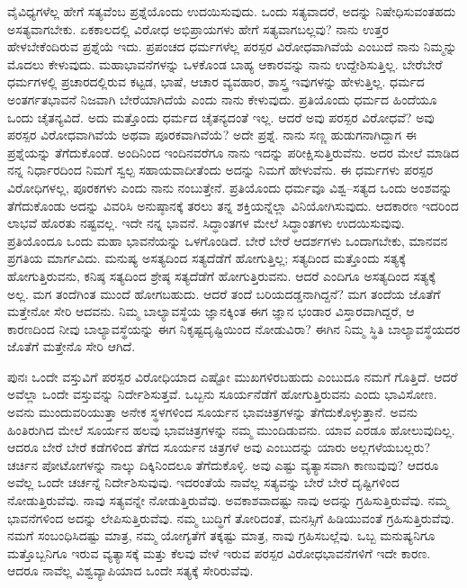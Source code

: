ವೈವಿಧ್ಯಗಳೆಲ್ಲ ಹೇಗೆ ಸತ್ಯವೆಂಬ ಪ್ರಶ್ನೆಯೊಂದು ಉದಯಿಸುವುದು. ಒಂದು ಸತ್ಯವಾದರೆ, ಅದನ್ನು ನಿಷೇಧಿಸುವಂತಹದು ಅಸತ್ಯವಾಗಬೇಕು. ಏಕಕಾಲದಲ್ಲಿ ವಿರೋಧ ಅಭಿಪ್ರಾಯಗಳು ಹೇಗೆ ಸತ್ಯವಾಗಬಲ್ಲವು? ನಾನು ಉತ್ತರ ಹೇಳಬೇಕೆಂದಿರುವ ಪ್ರಶ್ನೆಯೆ ಇದು. ಪ್ರಪಂಚದ ಧರ್ಮಗಳೆಲ್ಲ ಪರಸ್ಪರ ವಿರೋಧವಾಗಿವೆಯೆ ಎಂಬುದೆ ನಾನು ನಿಮ್ಮನ್ನು ಮೊದಲು ಕೇಳುವುದು. ಮಹಾಭಾವನೆಗಳನ್ನು ಒಳಕೊಂಡ ಬಾಹ್ಯ ಆಕಾರವನ್ನು ನಾನು ಉದ್ದೇಶಿಸುತ್ತಿಲ್ಲ. ಬೇರೆಬೇರೆ ಧರ್ಮಗಳಲ್ಲಿ ಪ್ರಚಾರದಲ್ಲಿರುವ ಕಟ್ಟಡ, ಭಾಷೆ, ಆಚಾರ ವ್ಯವಹಾರ, ಶಾಸ್ತ್ರ ಇವುಗಳನ್ನು ಹೇಳುತ್ತಿಲ್ಲ. ಧರ್ಮದ ಅಂತರ್ಗತಭಾವನೆ ನಿಜವಾಗಿ ಬೇರೆಯಾಗಿದೆಯೆ ಎಂದು ನಾನು ಕೇಳುವುದು. ಪ್ರತಿಯೊಂದು ಧರ್ಮದ ಹಿಂದೆಯೂ ಒಂದು ಚೈತನ್ಯವಿದೆ. ಅದು ಮತ್ತೊಂದು ಧರ್ಮದ ಚೈತನ್ಯದಂತೆ ಇಲ್ಲ. ಆದರೆ ಅವು ಪರಸ್ಪರ ವಿರೋಧವೆ? ಅವು ಪರಸ್ಪರ ವಿರೋಧವಾಗಿವೆಯೆ ಅಥವಾ ಪೂರಕವಾಗಿವೆಯೆ? ಅದೇ ಪ್ರಶ್ನೆ. ನಾನು ಸಣ್ಣ ಹುಡುಗನಾಗಿದ್ದಾಗ ಈ ಪ್ರಶ್ನೆಯನ್ನು ತೆಗೆದುಕೊಂಡೆ. ಅಂದಿನಿಂದ ಇಂದಿನವರೆಗೂ ನಾನು ಇದನ್ನು ಪರೀಕ್ಷಿಸುತ್ತಿರುವೆನು. ಅದರ ಮೇಲೆ ಮಾಡಿದ ನನ್ನ ನಿರ್ಧಾರದಿಂದ ನಿಮಗೆ ಸ್ವಲ್ಪ ಸಹಾಯವಾದೀತೆಂದು ಅದನ್ನು ನಿಮಗೆ ಹೇಳುವೆನು. ಈ ಧರ್ಮಗಳು ಪರಸ್ಪರ ವಿರೋಧಿಗಳಲ್ಲ, ಪೂರಕಗಳು ಎಂದು ನಾನು ನಂಬುತ್ತೇನೆ. ಪ್ರತಿಯೊಂದು ಧರ್ಮವೂ ವಿಶ್ವ–ಸತ್ಯದ ಒಂದು ಅಂಶವನ್ನು ತೆಗೆದುಕೊಂಡು ಅದನ್ನು ವಿವರಿಸಿ ಅನುಷ್ಠಾನಕ್ಕೆ ತರಲು ತನ್ನ ಶಕ್ತಿಯನ್ನೆಲ್ಲಾ ವಿನಿಯೋಗಿಸುವುದು. ಆದಕಾರಣ ಇದರಿಂದ ಲಾಭವೆ ಹೊರತು ನಷ್ಟವಲ್ಲ. ಇದೇ ನನ್ನ ಭಾವನೆ. ಸಿದ್ಧಾಂತಗಳ ಮೇಲೆ ಸಿದ್ಧಾಂತಗಳು ಉದಯಿಸುವುವು. ಪ್ರತಿಯೊಂದೂ ಒಂದು ಮಹಾ ಭಾವನೆಯನ್ನು ಒಳಗೊಂಡಿದೆ. ಬೇರೆ ಬೇರೆ ಆದರ್ಶಗಳು ಒಂದಾಗಬೇಕು, ಮಾನವನ ಪ್ರಗತಿಯ ಮಾರ್ಗವಿದು. ಮನುಷ್ಯ ಅಸತ್ಯದಿಂದ ಸತ್ಯದೆಡೆಗೆ ಹೋಗುತ್ತಿಲ್ಲ; ಸತ್ಯದಿಂದ ಮತ್ತೊಂದು ಸತ್ಯಕ್ಕೆ ಹೋಗುತ್ತಿರುವನು, ಕನಿಷ್ಠ ಸತ್ಯದಿಂದ ಶ್ರೇಷ್ಠ ಸತ್ಯದೆಡೆಗೆ ಹೋಗುತ್ತಿರುವನು. ಆದರೆ ಎಂದಿಗೂ ಅಸತ್ಯದಿಂದ ಸತ್ಯಕ್ಕೆ ಅಲ್ಲ. ಮಗ ತಂದೆಗಿಂತ ಮುಂದೆ ಹೋಗಬಹುದು. ಆದರೆ ತಂದೆ ಬರಿಯ\break ದಡ್ಡನಾಗಿದ್ದನೆ? ಮಗ ತಂದೆಯ ಜೊತೆಗೆ ಮತ್ತೇನೋ ಸೇರಿ ಆದವನು. ನಿಮ್ಮ ಬಾಲ್ಯಾವಸ್ಥೆಯ ಜ್ಞಾನಕ್ಕಿಂತ ಈಗ ಜ್ಞಾನ ಭಂಡಾರ ವಿಸ್ತಾರವಾಗಿದ್ದರೆ, ಆ ಕಾರಣದಿಂದ ನೀವು ಬಾಲ್ಯಾವಸ್ಥೆಯನ್ನು ಈಗ ನಿಕೃಷ್ಟದೃಷ್ಟಿಯಿಂದ ನೋಡುವಿರಾ? ಈಗಿನ ನಿಮ್ಮ ಸ್ಥಿತಿ ಬಾಲ್ಯಾವಸ್ಥೆಯದರ ಜೊತೆಗೆ ಮತ್ತೇನೊ ಸೇರಿ ಆಗಿದೆ.

\vskip 5pt

ಪುನಃ ಒಂದೇ ವಸ್ತುವಿಗೆ ಪರಸ್ಪರ ವಿರೋಧಿಯಾದ ಎಷ್ಟೋ ಮುಖಗಳಿರಬಹುದು ಎಂಬುದೂ ನಮಗೆ ಗೊತ್ತಿದೆ. ಆದರೆ ಅವೆಲ್ಲಾ ಒಂದೇ ವಸ್ತುವನ್ನು ನಿರ್ದೇಶಿಸುತ್ತವೆ. ಒಬ್ಬನು ಸೂರ್ಯನೆಡೆಗೆ ಹೋಗುತ್ತಿರುವನು ಎಂದು ಭಾವಿಸೋಣ. ಅವನು ಮುಂದುವರಿಯುತ್ತಾ ಅನೇಕ ಸ್ಥಳಗಳಿಂದ ಸೂರ್ಯನ ಭಾವಚಿತ್ರಗಳನ್ನು ತೆಗೆದುಕೊಳ್ಳುತ್ತಾನೆ. ಅವನು ಹಿಂತಿರುಗಿದ ಮೇಲೆ ಸೂರ್ಯನ ಹಲವು ಭಾವಚಿತ್ರಗಳನ್ನು ನಮ್ಮ ಮುಂದಿಡುವನು. ಯಾವ ಎರಡೂ ಹೋಲುವುದಿಲ್ಲ. ಆದರೂ ಬೇರೆ ಬೇರೆ ಕಡೆಗಳಿಂದ ತೆಗೆದ ಸೂರ್ಯನ ಚಿತ್ರಗಳೆ ಅವು ಎಂಬುದನ್ನು ಯಾರು ಅಲ್ಲಗಳೆಯಬಲ್ಲರು? ಚರ್ಚಿನ ಪೋಟೋಗಳನ್ನು ನಾಲ್ಕು ದಿಕ್ಕಿನಿಂದಲೂ ತೆಗೆದುಕೊಳ್ಳಿ. ಅವು ಎಷ್ಟು ವ್ಯತ್ಯಾಸವಾಗಿ ಕಾಣುವುವು? ಆದರೂ ಅವೆಲ್ಲ ಒಂದೇ ಚರ್ಚನ್ನೆ ನಿರ್ದೇಶಿಸುವುವು. ಇದರಂತೆಯೆ ನಾವೆಲ್ಲ ಸತ್ಯವನ್ನು ಬೇರೆ ಬೇರೆ ದೃಷ್ಟಿಗಳಿಂದ ನೋಡುತ್ತಿರುವೆವು. ನಾವು ಸತ್ಯವನ್ನೇ ನೋಡುತ್ತಿರುವೆವು. ಅವಕಾಶವಾದಷ್ಟು ನಾವು ಅದನ್ನು ಗ್ರಹಿಸುತ್ತಿರುವೆವು. ನಮ್ಮ ಭಾವನೆಗಳಿಂದ ಅದನ್ನು ಲೇಪಿಸುತ್ತಿರುವೆವು. ನಮ್ಮ ಬುದ್ಧಿಗೆ ತೋರಿದಂತೆ, ಮನಸ್ಸಿಗೆ ಹಿಡಿಯುವಂತೆ ಗ್ರಹಿಸುತ್ತಿರುವೆವು. ನಮಗೆ ಸಂಬಂಧಿಸಿದಷ್ಟು ಮಾತ್ರ, ನಮ್ಮ ಯೋಗ್ಯತೆಗೆ ತಕ್ಕಷ್ಟು ಮಾತ್ರ, ನಾವು ಗ್ರಹಿಸಬಲ್ಲೆವು. ಒಬ್ಬ ಮನುಷ್ಯನಿಗೂ ಮತ್ತೊಬ್ಬನಿಗೂ ಇರುವ ವ್ಯತ್ಯಾಸಕ್ಕೆ ಮತ್ತು ಕೆಲವು ವೇಳೆ ಇರುವ ಪರಸ್ಪರ ವಿರೋಧಭಾವನೆಗಳಿಗೆ ಇದೇ ಕಾರಣ. ಆದರೂ ನಾವೆಲ್ಲ ವಿಶ್ವವ್ಯಾಪಿಯಾದ ಒಂದೇ ಸತ್ಯಕ್ಕೆ ಸೇರಿರುವೆವು.


